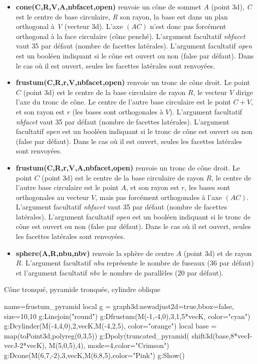 \begin{itemize}
    \item \textbf{cone(C,R,V,A,nbfacet,open)} renvoie un cône de sommet $A$ (point 3d), \emph{C} est le centre de base circulaire, \emph{R} son rayon, la base est dans un plan orthogonal à \emph{V} (vecteur 3d). L'axe $(AC)$ n'est donc pas forcément orthogonal à la face circulaire (cône penché). L'argument facultatif \emph{nbfacet} vaut 35 par défaut (nombre de facettes latérales). L'argument facultatif \emph{open} est un booléen indiquant si le cône est ouvert ou non (false par défaut). Dans le cas où il est ouvert, seules les facettes latérales sont renvoyées.        

    \item \textbf{frustum(C,R,r,V,nbfacet,open)} renvoie un tronc de cône droit. Le point $C$ (point 3d) est le centre de la base circulaire de rayon $R$, le vecteur $V$ dirige l'axe du tronc de cône. Le centre de l'autre base circulaire est le point $C+V$, et son rayon est $r$ (les bases sont orthogonales à $V$). L'argument facultatif \emph{nbfacet} vaut 35 par défaut (nombre de facettes latérales). L'argument facultatif \emph{open} est un booléen indiquant si le tronc de cône est ouvert ou non (false par défaut). Dans le cas où il est ouvert, seules les facettes latérales sont renvoyées.    
    
    \item \textbf{frustum(C,R,r,V,A,nbfacet,open)} renvoie un tronc de cône droit. Le point $C$ (point 3d) est le centre de la base circulaire de rayon $R$, le centre de l'autre base circulaire est le point $A$, et son rayon est $r$, les bases sont orthogonales au vecteur $V$, mais pas forcément orthogonales à l'axe $(AC)$. L'argument facultatif \emph{nbfacet} vaut 35 par défaut (nombre de facettes latérales). L'argument facultatif \emph{open} est un booléen indiquant si le tronc de cône est ouvert ou non (false par défaut). Dans le cas où il est ouvert, seules les facettes latérales sont renvoyées.

    \item \textbf{sphere(A,R,nbu,nbv)} renvoie la sphère de centre $A$ (point 3d) et de rayon $R$. L'argument facultatif \emph{nbu} représente le nombre de fuseaux (36 par défaut) et l'argument facultatif \emph{nbv} le nombre de parallèles (20 par défaut).
\end{itemize}

\begin{demo}{Cône tronqué, pyramide tronquée, cylindre oblique}
\begin{luadraw}{name=frustum_pyramid}
local g = graph3d:new{adjust2d=true,bbox=false, size={10,10} }
g:Linejoin("round")
g:Dfrustum(M(-1,-4,0),3,1,5*vecK, {color="cyan"})
g:Dcylinder(M(-4,4,0),2,vecK,M(-4,2,5), {color="orange"})
local base = map(toPoint3d,polyreg(0,3,5))
g:Dpoly(truncated_pyramid( shift3d(base,8*vecI-vecJ-2*vecK), M(5,0,5),4), {mode=4,color="Crimson"})
g:Dcone(M(6,7,-2),3,vecK,M(6,8,5),{color="Pink"})
g:Show()            
\end{luadraw}
\end{demo}

